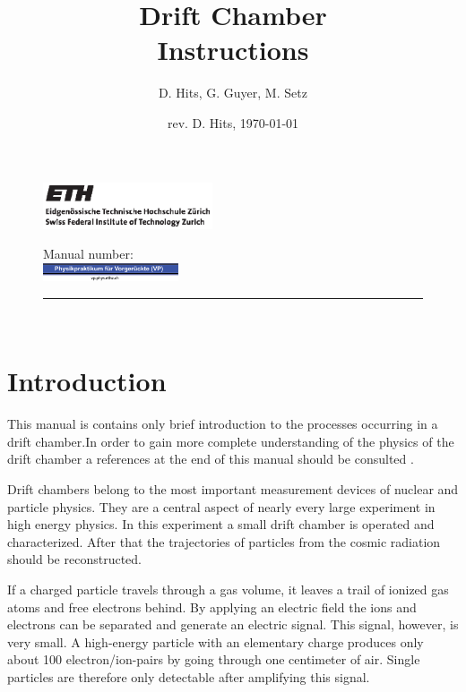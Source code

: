\documentclass[12pt]{article}
\begin{document}
\begin{figure}
\begin{minipage}{0.5\linewidth}
\begin{flushleft}
\includegraphics[width=5cm]{pics/ethlogo_black.eps}
\end{flushleft}
\end{minipage}
\hspace{0.05cm}
\begin{minipage}{0.5\linewidth}
\begin{flushright}
Manual number:\hspace{2cm}\\[0.5cm]
\includegraphics[width=4cm]{pics/VP-Logo.eps}
\end{flushright}
\end{minipage}
\hrule height 1pt\hfill \\[3cm]
\end{figure} 

\title{Drift Chamber\\ Instructions}
\author{D. Hits, G. Guyer, M. Setz}
\date{rev. D. Hits, \today}
\maketitle

\newpage
\section{Introduction}


This manual is contains only brief introduction to the processes occurring in a drift chamber.In order to gain more complete understanding of the physics of the drift chamber a references at the end of this manual should be consulted \cite{DriftChamberBook, knoll, NIMwiki}. 

Drift chambers belong to the most important measurement devices of nuclear and particle physics. They are a central aspect of nearly every large experiment in high energy physics. In this experiment a small drift chamber is operated and characterized. After that the trajectories of particles from the cosmic radiation should be reconstructed. 

If a charged particle travels through a gas volume, it leaves a trail of ionized gas atoms and free electrons behind. By applying an electric field the ions and electrons can be separated and generate an electric signal. This signal, however, is very small. A high-energy particle with an elementary charge produces only about 100 electron/ion-pairs by going through one centimeter of air. Single particles are therefore only detectable after amplifying this signal. 
\end{document}
